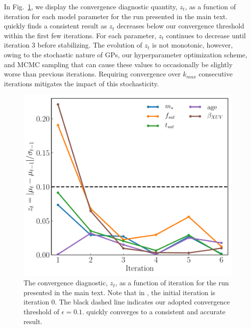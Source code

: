 In Fig.~\ref{AP:fig:convergence}, we display the convergence diagnostic quantity, $z_t$, as a function of iteration for each model parameter for the \approxposterior run presented in the main text. \approxposterior quickly finds a consistent result as $z_t$ decreases below our convergence threshold within the first few iterations. For each parameter, $z_t$ continues to decrease until iteration 3 before stabilizing. The evolution of $z_t$ is not monotonic, however, owing to the stochastic nature of GPs, our hyperparameter optimization scheme, and MCMC sampling that can cause these values to occasionally be slightly worse than previous iterations. Requiring convergence over $k_{max}$ consecutive iterations mitigates the impact of this stochasticity.

\begin{figure}
\centering
	\includegraphics[width=\textwidth]{convergence.pdf}
   \caption{The \approxposterior convergence diagnostic, $z_t$, as a function of iteration for the run presented in the main text. Note that in \approxposterior, the initial iteration is iteration 0. The black dashed line indicates our adopted convergence threshold of $\epsilon = 0.1$. \approxposterior quickly converges to a consistent and accurate result.}%
    \label{AP:fig:convergence}%
\end{figure}